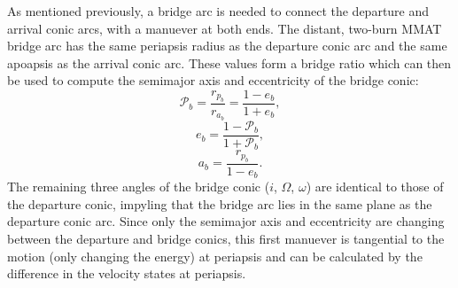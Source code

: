 As mentioned previously, a bridge arc is needed to connect the departure and arrival conic arcs,
with a manuever at both ends. The distant, two-burn MMAT bridge arc has the same periapsis radius
as the departure conic arc and the same apoapsis as the arrival conic arc. These values form a
bridge ratio which can then be used to compute the semimajor axis and eccentricity of the bridge
conic:
\begin{equation}
    \mathcal{P}_{b}=\frac{r_{p_{b}}}{r_{a_{b}}}=\frac{1-e_{b}}{1+e_{b}},
    \label{eq:bridgeratio}
\end{equation}
\begin{equation}
    e_{b}=\frac{1-\mathcal{P}_{b}}{1+\mathcal{P}_{b}},
    \label{eq:bridgeeccentricity}
\end{equation}
\begin{equation}
    a_{b}=\frac{r_{p_{b}}}{1-e_{b}}.
    \label{eq:bridgesemimajoraxis}
\end{equation}
The remaining three angles of the bridge conic ($i$, $\Omega$, $\omega$) are identical to those of
the departure conic, impyling that the bridge arc lies in the same plane as the departure conic
arc. Since only the semimajor axis and eccentricity are changing between the departure and bridge
conics, this first manuever is tangential to the motion (only changing the energy) at periapsis and
can be calculated by the difference in the velocity states at periapsis.


